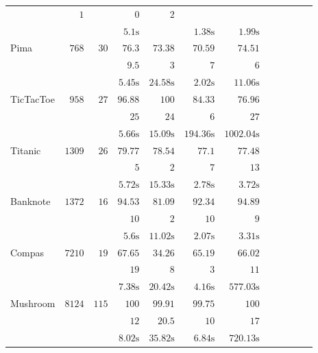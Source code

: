 \begin{table}
\begin{center}
\begin{tabular}{l  r  r r r r r r r rrr}
			& $   1 $    &       & $   0 $    & $   2 $   \\ & & 
			& $   5.1 \text{s}  $    &       & $   1.38 \text{s}  $    & $   1.99 \text{s}  $   \\[.1cm] 
			{ Pima}   & $  768 $  & $  30 $  & $   76.3  $    & $   73.38  $    & $   70.59  $    & $   74.51  $   \\ & & 
			& $   9.5  $    & $   3 $    & $   7 $    & $   6 $   \\ & & 
			& $   5.45 \text{s}  $    & $   24.58 \text{s}  $    & $   2.02 \text{s}  $    & $   11.06 \text{s}  $   \\[.1cm] 
			{ TicTacToe}   & $  958 $  & $  27 $  & $   96.88  $    & $   100 $    & $   84.33  $    & $   76.96  $   \\ & & 
			& $   25 $    & $   24 $    & $   6 $    & $   27 $   \\ & & 
			& $   5.66 \text{s}  $    & $   15.09 \text{s}  $    & $   194.36 \text{s}  $    & $   1002.04 \text{s}  $   \\[.1cm] 
			{ Titanic}   & $  1309 $  & $  26 $  & $   79.77  $    & $   78.54  $    & $   77.1  $    & $   77.48  $   \\ & & 
			& $   5 $    & $   2 $    & $   7 $    & $   13 $   \\ & & 
			& $   5.72 \text{s}  $    & $   15.33 \text{s}  $    & $   2.78 \text{s}  $    & $   3.72 \text{s}  $   \\[.1cm] 
			{ Banknote}   & $  1372 $  & $  16 $  & $   94.53  $    & $   81.09  $    & $   92.34  $    & $   94.89  $   \\ & & 
			& $   10 $    & $   2 $    & $   10 $    & $   9 $   \\ & & 
			& $   5.6 \text{s}  $    & $   11.02 \text{s}  $    & $   2.07 \text{s}  $    & $   3.31 \text{s}  $   \\[.1cm] 
			{ Compas}   & $  7210 $  & $  19 $  & $   67.65  $    & $   34.26  $    & $   65.19  $    & $   66.02  $   \\ & & 
			& $   19 $    & $   8 $    & $   3 $    & $   11 $   \\ & & 
			& $   7.38 \text{s}  $    & $   20.42 \text{s}  $    & $   4.16 \text{s}  $    & $   577.03 \text{s}  $   \\[.1cm] 
			{ Mushroom}   & $  8124 $  & $  115 $  & $   100 $    & $   99.91  $    & $   99.75  $    & $   100 $   \\ & & 
			& $   12 $    & $   20.5  $    & $   10 $    & $   17 $   \\ & & 
			& $   8.02 \text{s}  $    & $   35.82 \text{s}  $    & $   6.84 \text{s}  $    & $   720.13 \text{s}  $   \\[.1cm] 

\end{tabular}
\end{center}
\end{table}
